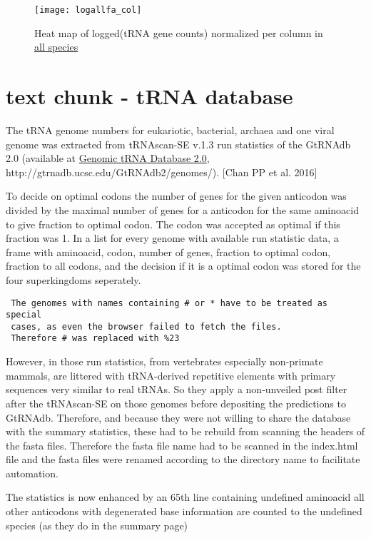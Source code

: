 \begin{figure}[tb] 
\centering 
\texttt{[image: logallfa\_col]} 
\caption[Heat map for log(tRNA counts)]{Heat map of logged(tRNA gene counts) normalized per column in \hyperlink{data:veab}{all species}}
\label{fig:bycol} 
\end{figure}


\section{text chunk - tRNA database}
The tRNA genome numbers for eukariotic, bacterial, archaea and one viral genome was extracted from tRNAscan-SE v.1.3 run statistics of the GtRNAdb 2.0 (available at
\href{http://gtrnadb.ucsc.edu/GtRNAdb2/genomes/}{Genomic tRNA Database 2.0}, http://gtrnadb.ucsc.edu/GtRNAdb2/genomes/). \cite{Chan2016}[Chan PP et al. 2016]

To decide on optimal codons the number of genes for the given anticodon was divided by the maximal number of genes for a anticodon for the same aminoacid to give fraction to optimal codon. The codon was accepted as optimal if this fraction was 1. In a list for every genome with available run statistic data, a frame with aminoacid, codon, number of genes, fraction to optimal codon, fraction to all codons, and the decision if it is a optimal codon was stored for the four superkingdoms seperately.
 
\begin{verbatim}
 The genomes with names containing # or * have to be treated as special 
 cases, as even the browser failed to fetch the files. 
 Therefore # was replaced with %23
\end{verbatim}

However, in those run statistics, from vertebrates especially non-primate mammals, are littered with tRNA-derived repetitive elements with primary sequences very similar to real tRNAs. So they apply a non-unveiled post filter after the tRNAscan-SE on those genomes before depositing the predictions to GtRNAdb. Therefore, and because they were not willing to share the database with the summary statistics, these had to be rebuild from scanning the headers of the fasta files. Therefore the fasta file name had to be scanned in the index.html file and the fasta files were renamed according to the directory name to facilitate automation. 

The statistics is now enhanced by an 65th line containing undefined aminoacid all other anticodons with degenerated base information are counted to the undefined species (as they do in the summary page)

